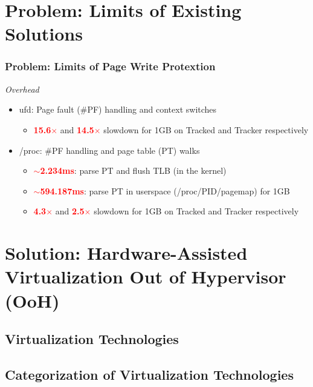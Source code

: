 \documentclass[xcolor=table,bigger,unknownkeysallowed]{beamer}
\newcommand{\myemph}[1]{\textcolor{red}{\bf #1}}
\begin{document}
\section{Problem: Limits of Existing Solutions}
\begin{frame}
	\frametitle{Problem: Limits of Page Write Protextion} 
	\emph{Overhead}\\
	\begin{itemize}
		\item ufd: Page fault (\#PF) handling and context switches
		\begin{itemize}
			\item \myemph{15.6$\times$} and \myemph{14.5$\times$} slowdown for 1GB on Tracked and Tracker respectively
		\end{itemize}
		\pause
		\item /proc: \#PF handling and page table (PT) walks
		\begin{itemize}
			\item \myemph{$\sim$2.234ms}: parse PT and flush TLB (in the kernel)
			\item \myemph{$\sim$594.187ms}: parse PT in userspace (/proc/PID/pagemap) for 1GB				
			\item \myemph{4.3$\times$} and \myemph{2.5$\times$} slowdown for 1GB on Tracked and Tracker respectively
		\end{itemize}					
	\end{itemize}
\end{frame}                   

\section{Solution: Hardware-Assisted Virtualization Out of Hypervisor (OoH)}
\subsection{Virtualization Technologies}
\subsection{Categorization of Virtualization Technologies}
\end{document}
